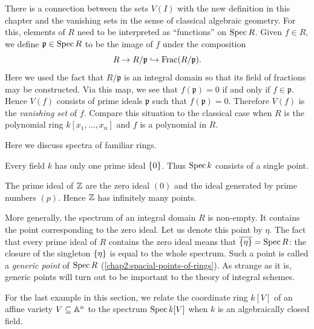 There is a connection between the sets $V(I)$ with the new definition in this chapter and the vanishing sets in the sense of classical algebraic geometry. For this, elements of $R$ need to be interpreted as ``functions'' on $\operatorname{Spec} R$. Given $f \in R$, we define  $\mathfrak{p} \in \operatorname{Spec} R$ to be the image of $f$ under the composition
\begin{equation*}
	R \to R/\mathfrak{p} \hookrightarrow \operatorname{Frac}(R/\mathfrak{p}).
\end{equation*}
Here we used the fact that $R/\mathfrak{p}$ is an integral domain so that its field of fractions may be constructed. Via this map, we see that $f(\mathfrak{p}) = 0$ if and only if $f \in \mathfrak{p}$. Hence $V(f)$ consists of prime ideals $\mathfrak{p}$ such that $f(\mathfrak{p}) = 0$. Therefore $V(f)$ is the \textit{vanishing set} of $f$. Compare this situation to the classical case when $R$ is the polynomial ring $k[x_1, \dotsc, x_n]$ and $f$ is a polynomial in $R$.

Here we discuss spectra of familiar rings.

\begin{example}
	Every field $k$ has only one prime ideal $\lbrace0\rbrace$. Thus $\operatorname{Spec} k$ consists of a single point.
\end{example}

\begin{example}[Spectrum of $\ZZ$]
	The prime ideal of $\ZZ$ are the zero ideal $(0)$ and the ideal generated by prime numbers $(p)$. Hence $\ZZ$ has infinitely many points.
\end{example}

More generally, the spectrum of an integral domain $R$ is non-empty. It contains the point corresponding to the zero ideal. Let us denote this point by $\eta$. The fact that every prime ideal of $R$ contains the zero ideal means that $\overline{\lbrace\eta\rbrace} = \operatorname{Spec} R$: the closure of the singleton $\lbrace\eta\rbrace$ is equal to the whole spectrum. Such a point is called a \textit{generic point} of $\operatorname{Spec} R$ (\cref{chap2:spacial-points-of-rings}). As strange as it is, generic points will turn out to be important to the theory of integral schemes.





For the last example in this section, we relate the coordinate ring $k[V]$ of an affine variety $V \subseteq \mathbb A^n$ to the spectrum $\operatorname{Spec} k[V]$ when $k$ is an algebraically closed field.

